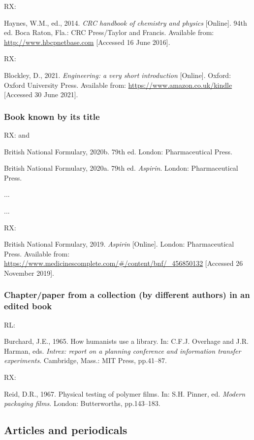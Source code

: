 RX: \cite{haynes2014crc}

Haynes, W.M., ed., 2014. \emph{CRC handbook of chemistry and physics} [Online]. 94th ed. Boca Raton, Fla.: CRC Press/Taylor and Francis. Available from: \url{http://www.hbcpnetbase.com} [Accessed 16 June 2016].


RX: \cite{blockley2021evs}

Blockley, D., 2021. \emph{Engineering: a very short introduction} [Online]. Oxford: Oxford University Press. Available from: \url{https://www.amazon.co.uk/kindle} [Accessed 30 June 2021].



\subsubsection*{Book known by its title}

RX: \cite{bnf2020} and \cite{aspirin2020bnf}

British National Formulary, 2020b. 79th ed. London: Pharmaceutical Press.

British National Formulary, 2020a. 79th ed. \emph{Aspirin}. London: Pharmaceutical Press.

...


...

RX: \cite{aspirin2019bnf}

British National Formulary, 2019. \emph{Aspirin} [Online]. London: Pharmaceutical Press. Available from: \url{https://www.medicinescomplete.com/#/content/bnf/_456850132} [Accessed 26 November 2019].



\subsubsection*{Chapter\slash paper from a collection (by different authors) in an edited book}

RL: \cite{burchard1965hhl}

Burchard, J.E., 1965. How humanists use a library. In: C.F.J. Overhage and J.R. Harman, eds. \emph{Intrex: report on a planning conference and information transfer experiments}. Cambridge, Mass.: MIT Press, pp.41--87.


RX: \cite{reid1967ptp}

Reid, D.R., 1967. Physical testing of polymer films. In: S.H. Pinner, ed. \emph{Modern packaging films}. London: Butterworths, pp.143--183.



\subsection{Articles and periodicals}

